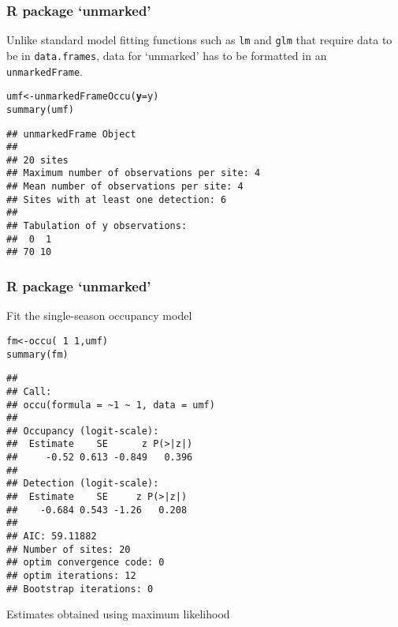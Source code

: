 \documentclass[color=usenames,dvipsnames]{beamer}\usepackage[]{graphicx}\usepackage[]{color}
\makeatletter
\newcommand{\hlnum}[1]{\textcolor[rgb]{0.69,0.494,0}{#1}}%
\newcommand{\hlopt}[1]{\textcolor[rgb]{0,0,0}{#1}}%
\newcommand{\hlstd}[1]{\textcolor[rgb]{0,0,0}{#1}}%
\newcommand{\hlkwb}[1]{\textcolor[rgb]{0,0.341,0.682}{#1}}%
\newcommand{\hlkwc}[1]{\textcolor[rgb]{0,0,0}{\textbf{#1}}}%
\newcommand{\hlkwd}[1]{\textcolor[rgb]{0.004,0.004,0.506}{#1}}%
\newenvironment{kframe}{%
 \def\at@end@of@kframe{}%
 \ifinner\ifhmode%
  \def\at@end@of@kframe{\end{minipage}}%
  \begin{minipage}{\columnwidth}%
 \fi\fi%
 \def\FrameCommand##1{\hskip\@totalleftmargin \hskip-\fboxsep
 \colorbox{shadecolor}{##1}\hskip-\fboxsep
     \hskip-\linewidth \hskip-\@totalleftmargin \hskip\columnwidth}%
 \MakeFramed {\advance\hsize-\width
   \@totalleftmargin\z@ \linewidth\hsize
   \@setminipage}}%
 {\par\unskip\endMakeFramed%
 \at@end@of@kframe}
\newenvironment{knitrout}{}{} %
\newcommand{\inr}[1]{\colorbox{inlinecolor}{\texttt{#1}}}
\makeatother
\begin{document}
\begin{frame}[fragile]
  \frametitle{R package `unmarked'}
  Unlike standard model fitting functions such as \inr{lm} and \inr{glm} 
  that require data to be in \texttt{data.frames}, data for `unmarked'
  has to be formatted in an \inr{unmarkedFrame}.
\begin{knitrout}\small
{}\color{fgcolor}\begin{kframe}
\begin{alltt}
\hlstd{umf} \hlkwb{<-} \hlkwd{unmarkedFrameOccu}\hlstd{(}\hlkwc{y}\hlstd{=y)}
\hlkwd{summary}\hlstd{(umf)}
\end{alltt}
\begin{verbatim}
## unmarkedFrame Object
## 
## 20 sites
## Maximum number of observations per site: 4 
## Mean number of observations per site: 4 
## Sites with at least one detection: 6 
## 
## Tabulation of y observations:
##  0  1 
## 70 10
\end{verbatim}
\end{kframe}
\end{knitrout}
\end{frame}





\begin{frame}[fragile]
  \frametitle{R package `unmarked'}
  \small
Fit the single-season occupancy model
\begin{knitrout}\scriptsize
{}\color{fgcolor}\begin{kframe}
\begin{alltt}
\hlstd{fm} \hlkwb{<-} \hlkwd{occu}\hlstd{(}\hlopt{~}\hlnum{1} \hlopt{~}\hlnum{1}\hlstd{, umf)}
\hlkwd{summary}\hlstd{(fm)}
\end{alltt}
\begin{verbatim}
## 
## Call:
## occu(formula = ~1 ~ 1, data = umf)
## 
## Occupancy (logit-scale):
##  Estimate    SE      z P(>|z|)
##     -0.52 0.613 -0.849   0.396
## 
## Detection (logit-scale):
##  Estimate    SE     z P(>|z|)
##    -0.684 0.543 -1.26   0.208
## 
## AIC: 59.11882 
## Number of sites: 20
## optim convergence code: 0
## optim iterations: 12 
## Bootstrap iterations: 0
\end{verbatim}
\end{kframe}
\end{knitrout}
Estimates obtained using maximum likelihood
\end{frame}
\end{document}
